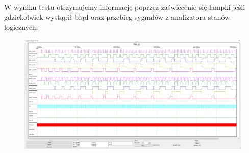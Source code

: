 \documentclass[a4paper]{article}
\begin{document}
\pagebreak
W wyniku testu otrzymujemy informację poprzez zaświecenie się lampki jeśli gdziekolwiek wystąpił błąd oraz 
przebieg sygnałów z analizatora stanów logicznych:
\begin{figure}[H]
    \centering
    \includegraphics[width=\textwidth]{general_test_logic_analyzer.png}
\end{figure}
\pagebreak
\end{document}
